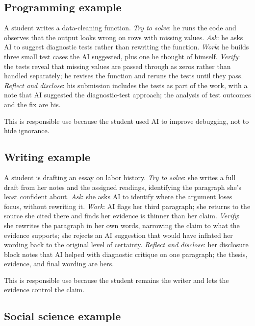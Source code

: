 \documentclass{SIAMbook2023}
\begin{document}
\subsection{Programming example}
\label{subsec:programming-example}%

A student writes a data-cleaning function. \emph{Try to solve}: he runs the code and observes that the output looks wrong on rows with missing values. \emph{Ask}: he asks AI to suggest diagnostic tests rather than rewriting the function. \emph{Work}: he builds three small test cases the AI suggested, plus one he thought of himself. \emph{Verify}: the tests reveal that missing values are passed through as zeros rather than handled separately; he revises the function and reruns the tests until they pass. \emph{Reflect and disclose}: his submission includes the tests as part of the work, with a note that AI suggested the diagnostic-test approach; the analysis of test outcomes and the fix are his.

This is responsible use because the student used AI to improve debugging, not to hide ignorance.

\subsection{Writing example}
\label{subsec:writing-example}

A student is drafting an essay on labor history. \emph{Try to solve}: she writes a full draft from her notes and the assigned readings, identifying the paragraph she's least confident about. \emph{Ask}: she asks AI to identify where the argument loses focus, without rewriting it. \emph{Work}: AI flags her third paragraph; she returns to the source she cited there and finds her evidence is thinner than her claim. \emph{Verify}: she rewrites the paragraph in her own words, narrowing the claim to what the evidence supports; she rejects an AI suggestion that would have inflated her wording back to the original level of certainty. \emph{Reflect and disclose}: her disclosure block notes that AI helped with diagnostic critique on one paragraph; the thesis, evidence, and final wording are hers.

This is responsible use because the student remains the writer and lets the evidence control the claim.

\subsection{Social science example}
\label{subsec:social-science-example}
\end{document}
